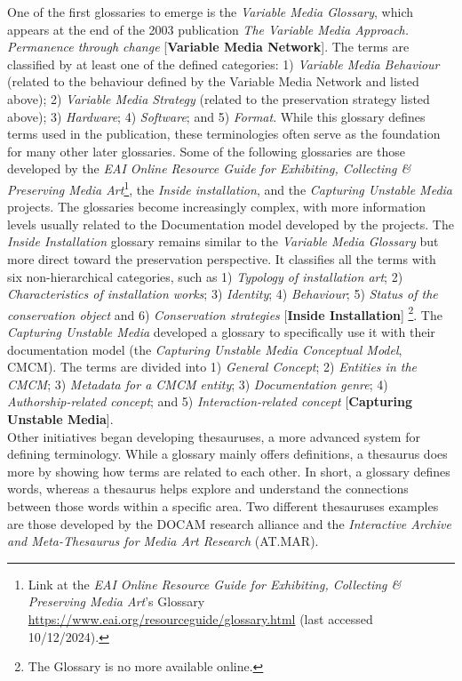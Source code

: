 One of the first glossaries to emerge is the \textit{Variable Media Glossary}, which appears at the end of the 2003 publication \textit{The Variable Media Approach. Permanence through change} \cite{depocas2003variable} [\textbf{Variable Media Network}]. The terms are classified by at least one of the defined categories: 1) \textit{Variable Media Behaviour} (related to the behaviour defined by the Variable Media Network and listed above); 2) \textit{Variable Media Strategy} (related to the preservation strategy listed above); 3) \textit{Hardware}; 4) \textit{Software}; and 5) \textit{Format}. While this glossary defines terms used in the publication, these terminologies often serve as the foundation for many other later glossaries. Some of the following glossaries are those developed by the \textit{EAI Online Resource Guide for Exhibiting, Collecting \& Preserving Media Art}\footnote{Link at the \textit{EAI Online Resource Guide for Exhibiting, Collecting \& Preserving Media Art}’s Glossary \url{https://www.eai.org/resourceguide/glossary.html} (last accessed 10/12/2024).}, the \textit{Inside installation}, and the \textit{Capturing Unstable Media} projects. The glossaries become increasingly complex, with more information levels usually related to the Documentation model developed by the projects. The \textit{Inside Installation} glossary remains similar to the \textit{Variable Media Glossary} but more direct toward the preservation perspective. It classifies all the terms with six non-hierarchical categories, such as  1) \textit{Typology of installation art}; 2) \textit{Characteristics of installation works}; 3) \textit{Identity}; 4) \textit{Behaviour}; 5) \textit{Status of the conservation object} and 6) \textit{Conservation strategies} [\textbf{Inside Installation}] \footnote{The Glossary is no more available online.}. The \textit{Capturing Unstable Media} developed a glossary to specifically use it with their documentation model (the \textit{Capturing Unstable Media Conceptual Model}, CMCM). The terms are divided into 1) \textit{General Concept}; 2) \textit{Entities in the CMCM}; 3) \textit{Metadata for a CMCM entity}; 3) \textit{Documentation genre}; 4) \textit{Authorship-related concept}; and 5) \textit{Interaction-related concept} [\textbf{Capturing Unstable Media}].\\
Other initiatives began developing thesauruses, a more advanced system for defining terminology. While a glossary mainly offers definitions, a thesaurus does more by showing how terms are related to each other. In short, a glossary defines words, whereas a thesaurus helps explore and understand the connections between those words within a specific area. Two different thesauruses examples are those developed by the DOCAM research alliance and the \textit{Interactive Archive and Meta-Thesaurus for Media Art Research} (AT.MAR).\\
